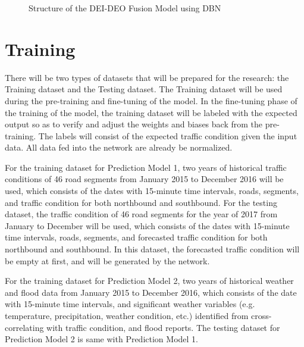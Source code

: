 \begin{figure}[h]
	\centering
	\captionsetup{justification=centering}
	\caption{Structure of the DEI-DEO Fusion Model using DBN}
	\label{fig:deideo_dbn}
\end{figure}



\section{Training}
There will be two types of datasets that will be prepared for the research: the Training dataset and the Testing dataset. The Training dataset will be used during the pre-training and fine-tuning of the model. In the fine-tuning phase of the training of the model, the training dataset will be labeled with the expected output so as to verify and adjust the weights and biases back from the pre-training. The labels will consist of the expected traffic condition given the input data. All data fed into the network are already be normalized. 

For the training dataset for Prediction Model 1, two years of historical traffic conditions of 46 road segments from January 2015 to December 2016 will be used, which consists of the dates with 15-minute time intervals, roads, segments, and traffic condition for both northbound and southbound. For the testing dataset, the traffic condition of 46 road segments for the year of 2017 from January to December will be used, which consists of the dates with 15-minute time intervals, roads, segments, and forecasted traffic condition for both northbound and southbound. In this dataset, the forecasted traffic condition will be empty at first, and will be generated by the network. 

For the training dataset for Prediction Model 2, two years of historical weather and flood data from January 2015 to December 2016, which consists of the date with 15-minute time intervals, and significant weather variables (e.g. temperature, precipitation, weather condition, etc.) identified from cross-correlating with traffic condition, and flood reports. The testing dataset for Prediction Model 2 is same with Prediction Model 1. 

